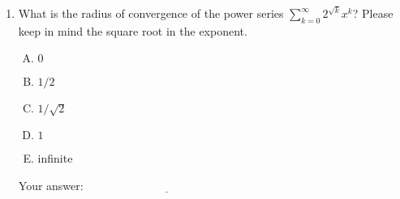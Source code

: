\documentclass[10pt]{amsart}
\begin{document}
\begin{enumerate}
\item What is the radius of convergence of the power series
  $\sum_{k=0}^\infty 2^{\sqrt{k}} x^k$? Please keep in mind the square
  root in the exponent.

  \begin{enumerate}[(A)]
  \item $0$
  \item $1/2$
  \item $1/\sqrt{2}$
  \item $1$
  \item infinite
  \end{enumerate}

  \vspace{0.05in}
  Your answer: $\underline{\qquad\qquad\qquad\qquad\qquad\qquad\qquad}$
  \vspace{0.05in}

\end{enumerate}
\end{document}
